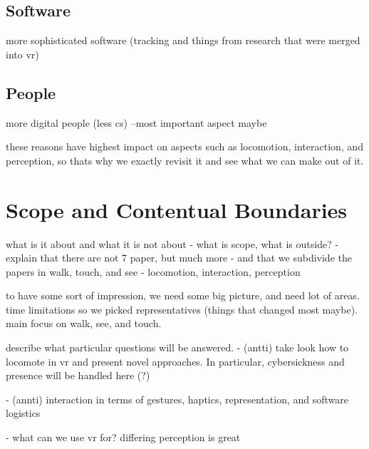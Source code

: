 \subsection{Software}
more sophisticated software (tracking and things from research that were merged into vr)

\subsection{People}
more digital people (less cs) --most important aspect maybe


these reasons have highest impact on aspects such as locomotion, interaction, and perception, so thats why we exactly revisit it and see what we can make out of it.








\section{Scope and Contentual Boundaries}
what is it about and what it is not about
- what is scope, what is outside?
- explain that there are not 7 paper, but much more
- and that we subdivide the papers in walk, touch, and see - locomotion, interaction, perception






to have some sort of impression, we need some big picture, and need lot of areas. time limitations so we picked representatives (things that changed most maybe). main focus on walk, see, and touch.

describe what particular questions will be answered.
- (antti) take look how to locomote in vr and present novel approaches. In particular, cybersickness and presence will be handled here (?)


- (annti) interaction in terms of gestures, haptics, representation, and software logistics


- what can we use vr for? differing perception is great


